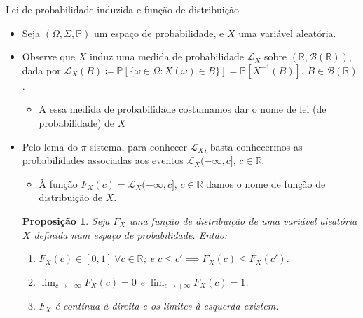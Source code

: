 \documentclass[11pt]{beamer}
\newtheorem{proposition}{Proposição}
\begin{document}
\begin{frame}{Lei de probabilidade induzida e função de distribuição}
	\begin{itemize}
	\item 	Seja $(\Omega, \Sigma, \mathbb{P} )$ um espaço de probabilidade, e $X$ uma variável aleatória.
	\item Observe que $X$ induz uma medida de probabilidade $\mathcal{L}_X$ sobre $(\mathbb{R},\mathcal{B}(\mathbb{R}))$, dada por $\mathcal{\mathcal{L}}_X(B)\coloneqq  \mathbb{P}[\{\omega \in \Omega: X(\omega) \in B\}] = \mathbb{P}[X^{-1}(B)]$, $B \in \mathcal{B}(\mathbb{R})$.
	\begin{itemize}
		\item A essa medida de probabilidade costumamos dar o nome de lei (de probabilidade) de $X$
	\end{itemize}
	\item Pelo lema do $\pi$-sistema, para conhecer $\mathcal{L}_X$, basta conhecermos as probabilidades associadas aos eventos $\mathcal{L}_X(-\infty,c]$, $c \in \mathbb{R}$.
	\begin{itemize}
		\item À função $F_X(c) = \mathcal{L}_X(-\infty,c]$, $c \in \mathbb{R}$ damos o nome de {\color{blue}função de distribuição de $X$}.
\end{itemize}
\begin{proposition}
	Seja $F_X$ uma função de distribuição de uma variável aleatória $X$ definida num espaço de probabilidade. Então:
	\begin{enumerate}
		\item $F_X(c) \in [0,1]\  \forall c \in \mathbb{R}$; e $c \leq c'\implies F_X(c) \leq F_X(c')$.
		\item $\lim_{c \to - \infty}F_X(c) =0$ e $\lim_{c \to +\infty}F_X(c) =1$.
		\item $F_X$ é contínua à direita e os limites à esquerda existem.
	\end{enumerate}
\end{proposition}
\end{itemize}
\end{frame}
\end{document}

